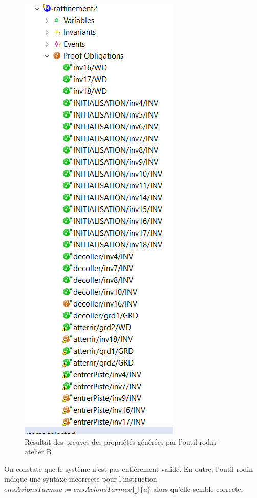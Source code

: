 \begin{figure}[H]
	\begin{center}	
		
		\includegraphics[scale=0.75]{images/2/proof2}
		\caption{ Résultat des preuves des propriétés générées par l'outil rodin - atelier B}
		\label{proof 2}
	\end{center}
\end{figure}

On constate que le système n'est pas entièrement validé. En outre, l'outil rodin indique une syntaxe incorrecte pour l'instruction $ensAvionsTarmac := ensAvionsTarmac ⋃ \{a\}$ alors qu'elle semble correcte.



